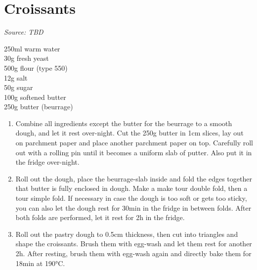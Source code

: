 \documentclass{report}
\begin{document}
\section{Croissants}
\textit{Source: TBD}\\
\begin{minipage}[t]{0.21\textwidth} \vspace{0pt} 
250ml warm water\\
30g fresh yeast\\
500g flour (type 550)\\
12g salt\\
50g sugar\\
100g softened butter\\
250g butter (beurrage)\\
\end{minipage}
\hfill
\begin{minipage}[t]{0.78\textwidth} \vspace{0pt}
	\begin{enumerate}
		\item Combine all ingredients except the butter for the beurrage to a smooth dough, and let it rest over-night. Cut the 250g butter in 1cm slices, lay out on parchment paper and place another parchment paper on top. Carefully roll out with a rolling pin until it becomes a uniform slab of putter. Also put it in the fridge over-night.
		\item Roll out the dough, place the beurrage-slab inside and fold the edges together that butter is fully enclosed in dough. Make a make tour double fold, then a tour simple fold. If necessary in case the dough is too soft or gets too sticky, you can also let the dough rest for 30min in the fridge in between folds. After both folds are performed, let it rest for 2h in the fridge.
		\item Roll out the pastry dough to 0.5cm thickness, then cut into triangles and shape the croissants. Brush them with egg-wash and let them rest for another 2h. After resting, brush them with egg-wash again and directly bake them for 18min at 190°C.
	\end{enumerate}	
\end{minipage}
\end{document}
